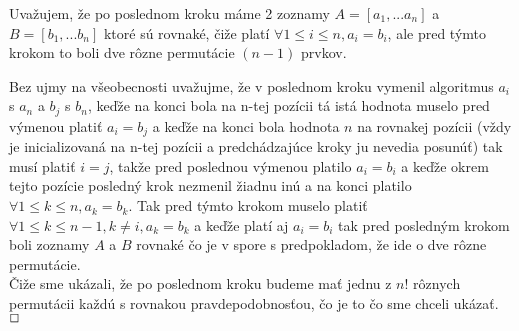 \documentclass[a4paper]{article}
\begin{document}
Uvažujem, že po poslednom kroku máme 2 zoznamy $A=[a_1,...a_n]$ a $B=[b_1,...b_n]$ ktoré sú rovnaké, čiže platí $\forall 1\leq i \leq n, a_i = b_i$, ale pred týmto krokom to boli dve rôzne permutácie $(n-1)$ prvkov. 

Bez ujmy na všeobecnosti uvažujme, že v poslednom kroku vymenil algoritmus $a_i$ s $a_n$ a $b_j$ s $b_n$, keďže na konci bola na n-tej pozícii tá istá hodnota muselo pred výmenou platiť $a_i = b_j$ a keďže na konci bola hodnota $n$ na rovnakej pozícii (vždy je inicializovaná na n-tej pozícii a predchádzajúce kroky ju nevedia posunúť) tak musí platiť $i=j$, takže pred poslednou výmenou platilo $a_i = b_i$ a keďže okrem tejto pozície posledný krok nezmenil žiadnu inú a na konci platilo  $\forall 1\leq k \leq n, a_k = b_k$. Tak pred týmto krokom muselo platiť  $\forall 1\leq k \leq n-1, k \neq i, a_k = b_k$ a keďže platí aj $a_i = b_i$ tak pred posledným krokom boli zoznamy $A$ a $B$ rovnaké čo je v spore s predpokladom, že ide o dve rôzne permutácie.
\\

Čiže sme ukázali, že po poslednom kroku budeme mať jednu z $n!$ rôznych permutácii každú s rovnakou pravdepodobnosťou, čo je to čo sme chceli ukázať. $\oblong$


  
 
\end{document}
